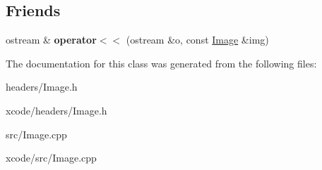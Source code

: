 \subsection*{Friends}
\begin{DoxyCompactItemize}
\item 
\hypertarget{class_image_a514d99877d9fdcfed14a8df1cc4237c7}{ostream \& {\bfseries operator$<$$<$} (ostream \&o, const \hyperlink{class_image}{Image} \&img)}\label{class_image_a514d99877d9fdcfed14a8df1cc4237c7}

\end{DoxyCompactItemize}


The documentation for this class was generated from the following files\-:\begin{DoxyCompactItemize}
\item 
headers/Image.\-h\item 
xcode/headers/Image.\-h\item 
src/Image.\-cpp\item 
xcode/src/Image.\-cpp\end{DoxyCompactItemize}
